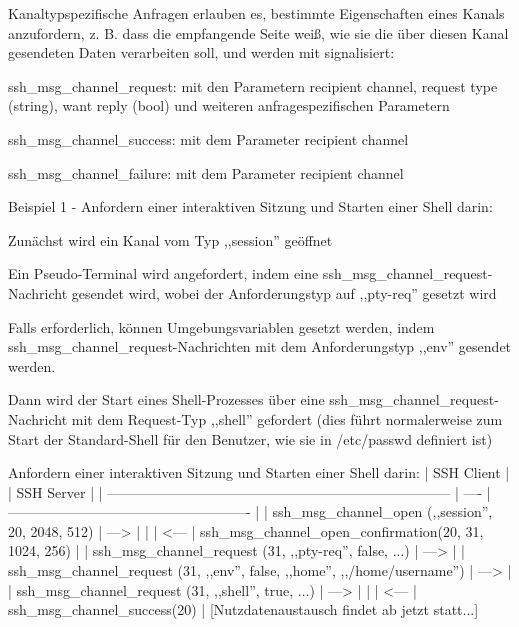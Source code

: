 \documentclass[a4paper]{article}
\begin{document}
\begin{multicols}{3}
\begin{itemize*}
\begin{itemize*}
\begin{itemize*}
                  \end{itemize*}
                  \item       Kanaltypspezifische Anfragen erlauben es, bestimmte Eigenschaften
                  eines Kanals anzufordern, z. B. dass die empfangende Seite weiß, wie
                  sie die über diesen Kanal gesendeten Daten verarbeiten soll, und
                  werden mit signalisiert:
                  \begin{itemize*}
                        \item ssh\_msg\_channel\_request: mit den Parametern recipient channel, request type (string), want reply (bool) und weiteren anfragespezifischen Parametern
                        \item ssh\_msg\_channel\_success: mit dem Parameter recipient channel
                        \item ssh\_msg\_channel\_failure: mit dem Parameter recipient channel
                  \end{itemize*}
                  \item       Beispiel 1 - Anfordern einer interaktiven Sitzung und Starten einer
                  Shell darin:
                  \begin{itemize*}
                        \item Zunächst wird ein Kanal vom Typ ,,session'' geöffnet
                        \item Ein Pseudo-Terminal wird angefordert, indem eine ssh\_msg\_channel\_request-Nachricht gesendet wird, wobei der Anforderungstyp auf ,,pty-req'' gesetzt wird
                        \item Falls erforderlich, können Umgebungsvariablen gesetzt werden, indem ssh\_msg\_channel\_request-Nachrichten mit dem Anforderungstyp ,,env'' gesendet werden.
                        \item Dann wird der Start eines Shell-Prozesses über eine ssh\_msg\_channel\_request-Nachricht mit dem Request-Typ ,,shell'' gefordert (dies führt normalerweise zum Start der Standard-Shell für den Benutzer, wie sie in /etc/passwd definiert ist)
                        \item Anfordern einer interaktiven Sitzung und Starten einer Shell darin: | SSH Client | | SSH Server | | -------------------------------------------------------------------------- | ---- | ---------------------------------------------------- | | ssh\_msg\_channel\_open (,,session'', 20, 2048, 512) | ---\textgreater{} | | | \textless--- | ssh\_msg\_channel\_open\_confirmation(20, 31, 1024, 256) | | ssh\_msg\_channel\_request (31, ,,pty-req'', false, ...) | ---\textgreater{} | | ssh\_msg\_channel\_request (31, ,,env'', false, ,,home'', ,,/home/username'') | ---\textgreater{} | | ssh\_msg\_channel\_request (31, ,,shell'', true, ...) | ---\textgreater{} | | | \textless--- | ssh\_msg\_channel\_success(20) |
                        {[}Nutzdatenaustausch findet ab jetzt statt...{]}
                  \end{itemize*}
            \end{itemize*}


\end{itemize*}
\end{multicols}
\end{document}
